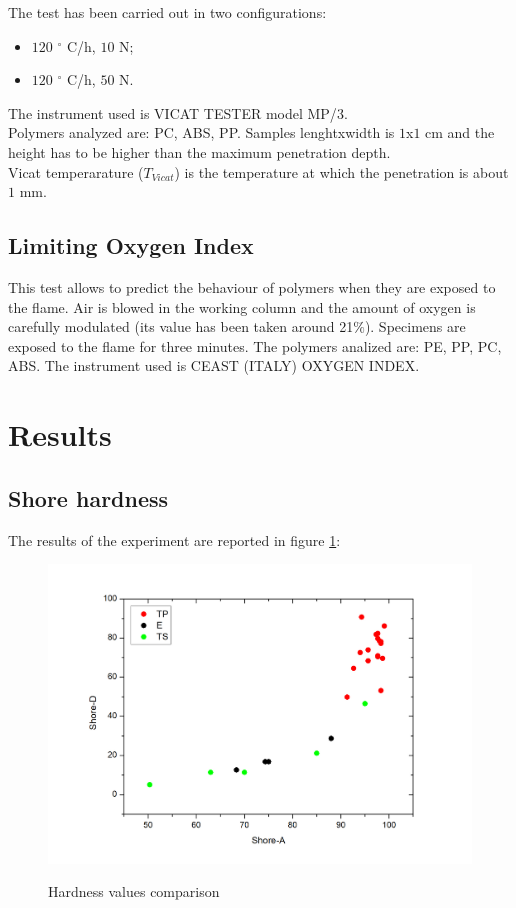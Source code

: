 \documentclass[a4paper, 11pt]{article}
\begin{document}
The test has been carried out in two configurations:

\begin{itemize}

\item $120$ $^\circ$ C/h, $10$ N;

\item $120$ $^\circ$ C/h, $50$ N.

\end{itemize}

The instrument used is VICAT TESTER model MP/$3$.\\
Polymers analyzed are: PC, ABS, PP. Samples lenghtxwidth is $1$x$1$ cm and the height has to be higher than the maximum penetration depth.\\
Vicat temperarature ($T_{Vicat}$) is the temperature at which the penetration is about $1$ mm.\\

\subsection{Limiting Oxygen Index}

This test allows to predict the behaviour of polymers when they are exposed to the flame. Air is blowed in the working column and the amount of oxygen is carefully modulated (its value has been taken around 21$\%$). Specimens are exposed to the flame for three minutes. The polymers analized are: PE, PP, PC, ABS. The instrument used is CEAST (ITALY) OXYGEN INDEX.

\section{Results}

\subsection{Shore hardness}

The results of the experiment are reported in figure \ref{fig:duro}:

\begin{figure}[htp]
	\centering
	{\includegraphics[scale=0.5]{duro}}
	\captionsetup{justification=centering}
	\caption{Hardness values comparison}
	\label{fig:duro}
\end{figure}
\end{document}
